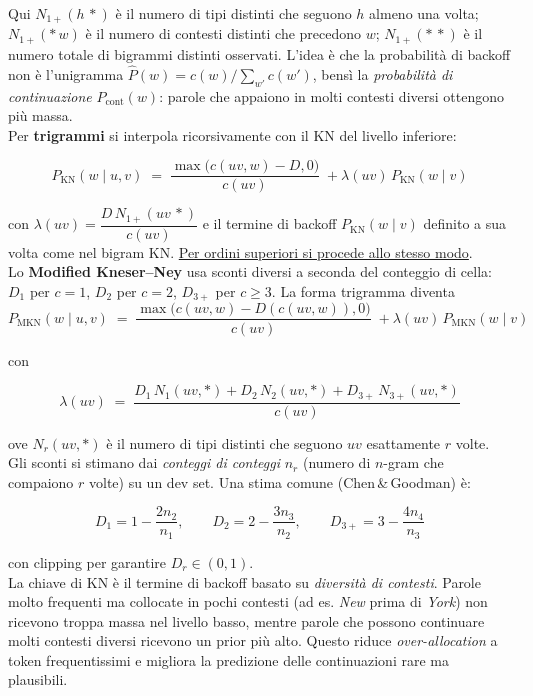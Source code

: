             Qui $N_{1+}(h\,\ast)$ è il numero di tipi distinti che seguono $h$ almeno una volta; $N_{1+}(\ast\,w)$ è il numero di contesti distinti che precedono $w$; $N_{1+}(\ast\,\ast)$ è il numero totale di bigrammi distinti osservati. L'idea è che la probabilità di backoff non è l'unigramma $\hat P(w)=c(w)/\sum_{w'}c(w')$, bensì la \textit{probabilità di continuazione} $P_{\text{cont}}(w)$: parole che appaiono in molti contesti diversi ottengono più massa.\\
            
            Per \textbf{trigrammi} si interpola ricorsivamente con il KN del livello inferiore:

            $$
            P_{\text{KN}}(w\mid u,v) \;=\; \frac{\max\big(c(uv\!,w)-D,0\big)}{c(uv)} \;+
            \lambda(uv)\,P_{\text{KN}}(w\mid v)
            $$
            
            con $\lambda(uv)=\dfrac{D\,N_{1+}(uv\,\ast)}{c(uv)}$ e il termine di backoff $P_{\text{KN}}(w\mid v)$ definito a sua volta come nel bigram KN. \underline{Per ordini superiori si procede allo stesso modo}.\\
            
            Lo \textbf{Modified Kneser--Ney} usa sconti diversi a seconda del conteggio di cella: $D_1$ per $c=1$, $D_2$ per $c=2$, $D_{3+}$ per $c\ge 3$. La forma trigramma diventa
            $$
            P_{\text{MKN}}(w\mid u,v) \;=\; \frac{\max\big(c(uv\!,w)-D(c(uv\!,w)),0\big)}{c(uv)} \;+
            \lambda(uv)\,P_{\text{MKN}}(w\mid v)
            $$
            
            con

            $$
            \lambda(uv) \;=\; \frac{D_1\,N_1(uv\!,\ast) + D_2\,N_2(uv\!,\ast) + D_{3+}\,N_{3+}(uv\!,\ast)}{c(uv)}
            $$
            
            ove $N_r(uv\!,\ast)$ è il numero di tipi distinti che seguono $uv$ esattamente $r$ volte. Gli sconti si stimano dai \textit{conteggi di conteggi} $n_r$ (numero di $n$-gram che compaiono $r$ volte) su un dev set. Una stima comune (Chen\,\&\,Goodman) è:

            $$
            D_1 = 1 - \frac{2n_2}{n_1},\qquad D_2 = 2 - \frac{3n_3}{n_2},\qquad D_{3+} = 3 - \frac{4n_4}{n_3}
            $$
            
            con clipping per garantire $D_r\in(0,1)$.\\
            
            La chiave di KN è il termine di backoff basato su \textit{diversità di contesti}. Parole molto frequenti ma collocate in pochi contesti (ad es. \textit{New} prima di \textit{York}) non ricevono troppa massa nel livello basso, mentre parole che possono continuare molti contesti diversi ricevono un prior più alto. Questo riduce \textit{over-allocation} a token frequentissimi e migliora la predizione delle continuazioni rare ma plausibili.\\
            
